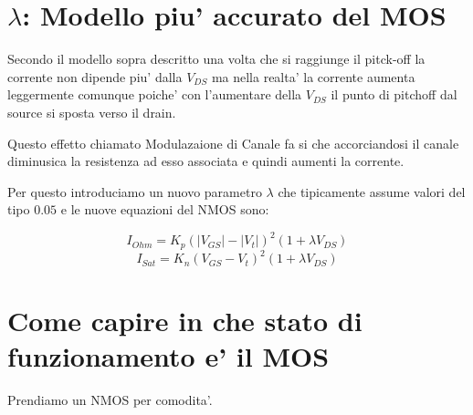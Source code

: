\documentclass[\main/main.tex]{subfiles}
\begin{document}
\clearpage
\section{$\lambda$: Modello piu' accurato del MOS}

Secondo il modello sopra descritto una volta che si raggiunge il pitck-off la corrente non dipende piu' dalla $V_{DS}$ ma nella realta' la corrente aumenta leggermente comunque poiche' con l'aumentare della $V_{DS}$ il punto di pitchoff dal source si sposta verso il drain.

Questo effetto chiamato Modulazaione di Canale fa si che accorciandosi il canale diminusica la resistenza ad esso associata e quindi aumenti la corrente.

Per questo introduciamo un nuovo parametro $\lambda$ che tipicamente assume valori del tipo $0.05$ e le nuove equazioni del NMOS sono:

\[ I_{Ohm} = K_p \left( |V_{GS}| - |V_t| \right)^2(1+\lambda V_{DS})\]
\[ I_{Sat} = K_n \left( V_{GS} - V_t \right)^2(1+\lambda V_{DS})\]

\begin{figure}[H]
	\center
\end{figure}

\clearpage
\section{Come capire in che stato di funzionamento e' il MOS}
Prendiamo un NMOS per comodita'.
\end{document}
